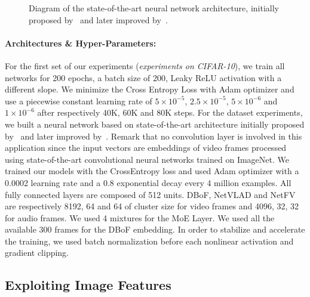\begin{figure}[htb]
  \centering
  
  \caption{Diagram of the state-of-the-art neural network architecture, initially proposed by~\citet{abu2016youtube} and later improved by~\citet{miech2017learnable}.}
  \label{figure:ch4-archi_youtube}
\end{figure}

\paragraph{Architectures \& Hyper-Parameters:} 
For the first set of our experiments (\emph{experiments on CIFAR-10}), we train all networks for 200 epochs, a batch size of 200, Leaky ReLU activation with a different slope.
We minimize the Cross Entropy Loss with Adam optimizer and use a piecewise constant learning rate of $5 \times 10^{-5}$, $2.5\times10^{-5}$, $5\times10^{-6}$ and $1\times10^{-6}$ after respectively 40K, 60K and 80K steps.
For the \yt dataset experiments, we built a neural network based on state-of-the-art architecture initially proposed by~\citet{abu2016youtube} and later improved by~\citet{miech2017learnable}.
Remark that no convolution layer is involved in this application since the input vectors are embeddings of video frames processed using state-of-the-art convolutional neural networks trained on ImageNet.
We trained our models with the CrossEntropy loss and used Adam optimizer with a 0.0002 learning rate and a 0.8 exponential decay every 4 million examples.
All fully connected layers are composed of 512 units.
DBoF, NetVLAD and NetFV are respectively 8192, 64 and 64 of cluster size for video frames and 4096, 32, 32 for audio frames.
We used 4 mixtures for the MoE Layer.
We used all the available 300 frames for the DBoF embedding.
In order to stabilize and accelerate the training, we used batch normalization before each nonlinear activation and gradient clipping. 


\subsection{Exploiting Image Features}

